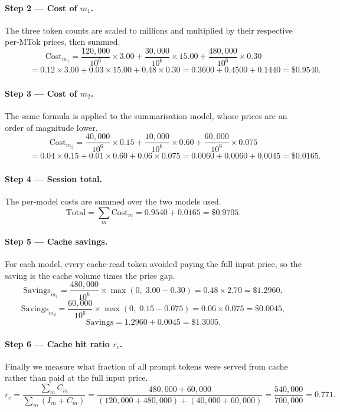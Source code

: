 \documentclass[11pt,a4paper]{article}
\begin{document}
\paragraph{Step 2 --- Cost of $m_1$.}
The three token counts are scaled to millions and multiplied by their
respective per-MTok prices, then summed.
\[
  \text{Cost}_{m_1}
  = \frac{120{,}000}{10^6} \times 3.00
  + \frac{30{,}000}{10^6} \times 15.00
  + \frac{480{,}000}{10^6} \times 0.30
\]
\[
  \phantom{\text{Cost}_{m_1}}
  = 0.12 \times 3.00 + 0.03 \times 15.00 + 0.48 \times 0.30
  = 0.3600 + 0.4500 + 0.1440
  = \$0.9540.
\]

\paragraph{Step 3 --- Cost of $m_2$.}
The same formula is applied to the summarisation model, whose prices are
an order of magnitude lower.
\[
  \text{Cost}_{m_2}
  = \frac{40{,}000}{10^6} \times 0.15
  + \frac{10{,}000}{10^6} \times 0.60
  + \frac{60{,}000}{10^6} \times 0.075
\]
\[
  \phantom{\text{Cost}_{m_2}}
  = 0.04 \times 0.15 + 0.01 \times 0.60 + 0.06 \times 0.075
  = 0.0060 + 0.0060 + 0.0045
  = \$0.0165.
\]

\paragraph{Step 4 --- Session total.}
The per-model costs are summed over the two models used.
\[
  \text{Total} = \sum_m \text{Cost}_m
               = 0.9540 + 0.0165
               = \$0.9705.
\]

\paragraph{Step 5 --- Cache savings.}
For each model, every cache-read token avoided paying the full input price,
so the saving is the cache volume times the price gap.
\[
  \text{Savings}_{m_1}
  = \frac{480{,}000}{10^6} \times \max(0,\; 3.00 - 0.30)
  = 0.48 \times 2.70
  = \$1.2960,
\]
\[
  \text{Savings}_{m_2}
  = \frac{60{,}000}{10^6} \times \max(0,\; 0.15 - 0.075)
  = 0.06 \times 0.075
  = \$0.0045,
\]
\[
  \text{Savings} = 1.2960 + 0.0045 = \$1.3005.
\]

\paragraph{Step 6 --- Cache hit ratio $r_c$.}
Finally we measure what fraction of all prompt tokens were served from
cache rather than paid at the full input price.
\[
  r_c = \frac{\sum_m C_m}{\sum_m (I_m + C_m)}
      = \frac{480{,}000 + 60{,}000}{(120{,}000 + 480{,}000) + (40{,}000 + 60{,}000)}
      = \frac{540{,}000}{700{,}000}
      = 0.771.
\]
\end{document}
